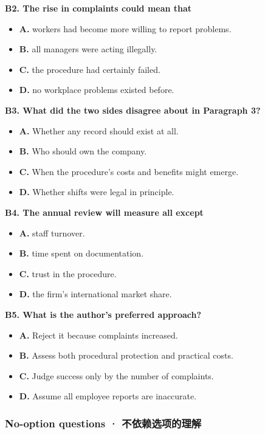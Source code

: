 \documentclass[
  11pt,
]{ctexart}
\begin{document}
\textbf{B2. The rise in complaints could mean that}

\begin{itemize}
\item
  \textbf{A.} workers had become more willing to report problems.
\item
  \textbf{B.} all managers were acting illegally.
\item
  \textbf{C.} the procedure had certainly failed.
\item
  \textbf{D.} no workplace problems existed before.
\end{itemize}

\textbf{B3. What did the two sides disagree about in Paragraph 3?}

\begin{itemize}
\item
  \textbf{A.} Whether any record should exist at all.
\item
  \textbf{B.} Who should own the company.
\item
  \textbf{C.} When the procedure's costs and benefits might emerge.
\item
  \textbf{D.} Whether shifts were legal in principle.
\end{itemize}

\textbf{B4. The annual review will measure all except}

\begin{itemize}
\item
  \textbf{A.} staff turnover.
\item
  \textbf{B.} time spent on documentation.
\item
  \textbf{C.} trust in the procedure.
\item
  \textbf{D.} the firm's international market share.
\end{itemize}

\textbf{B5. What is the author's preferred approach?}

\begin{itemize}
\item
  \textbf{A.} Reject it because complaints increased.
\item
  \textbf{B.} Assess both procedural protection and practical costs.
\item
  \textbf{C.} Judge success only by the number of complaints.
\item
  \textbf{D.} Assume all employee reports are inaccurate.
\end{itemize}

\subsubsection{No-option questions ·
不依赖选项的理解}\label{no-option-questions-ux4e0dux4f9dux8d56ux9009ux9879ux7684ux7406ux89e3-1}
\end{document}
